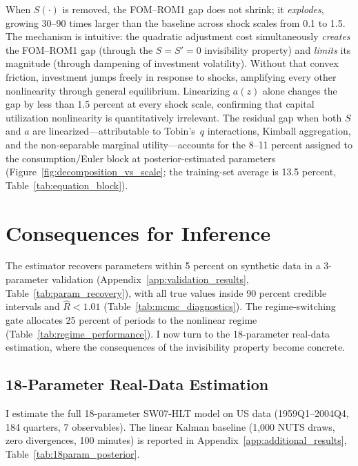 \documentclass[12pt]{article}
\theoremstyle{plain}
\theoremstyle{definition}
\theoremstyle{remark}
\begin{document}
When $S(\cdot)$ is removed, the FOM--ROM1 gap does not shrink; it \emph{explodes}, growing 30--90 times larger than the baseline across shock scales from 0.1 to 1.5. The mechanism is intuitive: the quadratic adjustment cost simultaneously \emph{creates} the FOM--ROM1 gap (through the $S = S' = 0$ invisibility property) and \emph{limits} its magnitude (through dampening of investment volatility). Without that convex friction, investment jumps freely in response to shocks, amplifying every other nonlinearity through general equilibrium. Linearizing $a(z)$ alone changes the gap by less than 1.5 percent at every shock scale, confirming that capital utilization nonlinearity is quantitatively irrelevant. The residual gap when both $S$ and $a$ are linearized---attributable to Tobin's~$q$ interactions, Kimball aggregation, and the non-separable marginal utility---accounts for the 8--11 percent assigned to the consumption/Euler block at posterior-estimated parameters (Figure~\ref{fig:decomposition_vs_scale}; the training-set average is 13.5 percent, Table~\ref{tab:equation_block}).



\section{Consequences for Inference}
\label{sec:inference_consequences}

The estimator recovers parameters within 5 percent on synthetic data in a 3-parameter validation (Appendix~\ref{app:validation_results}, Table~\ref{tab:param_recovery}), with all true values inside 90 percent credible intervals and $\hat{R} < 1.01$ (Table~\ref{tab:mcmc_diagnostics}). The regime-switching gate allocates 25 percent of periods to the nonlinear regime (Table~\ref{tab:regime_performance}). I now turn to the 18-parameter real-data estimation, where the consequences of the invisibility property become concrete.

\subsection{18-Parameter Real-Data Estimation}
\label{subsec:results_18param_kalman}

I estimate the full 18-parameter SW07-HLT model on US data (1959Q1--2004Q4, 184 quarters, 7 observables). The linear Kalman baseline (1,000 NUTS draws, zero divergences, 100 minutes) is reported in Appendix~\ref{app:additional_results}, Table~\ref{tab:18param_posterior}.
\end{document}
